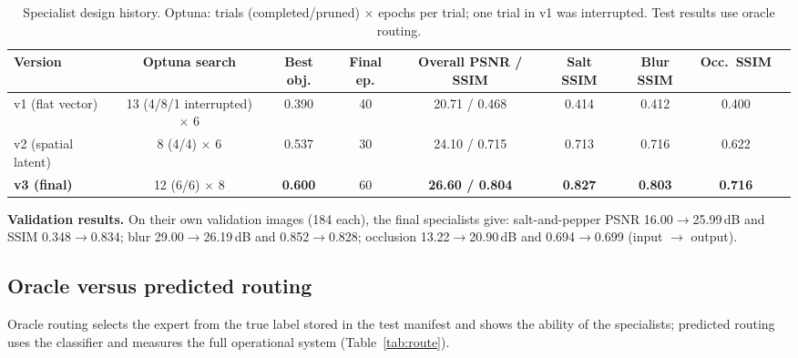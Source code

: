 \documentclass[conference]{IEEEtran}
\begin{document}
\begin{table}[t]
\centering
\caption{Specialist design history. Optuna: trials (completed/pruned) $\times$ epochs per trial; one trial in v1 was interrupted. Test results use oracle routing.}\label{tab:spechist}
\footnotesize\setlength{\tabcolsep}{4pt}
\begin{tabular}{@{}lcccccccc@{}}
\toprule
Version & Optuna search & Best obj. & Final ep. & Overall PSNR / SSIM & Salt SSIM & Blur SSIM & Occ.\ SSIM\\
\midrule
v1 (flat vector) & 13 (4/8/1 interrupted) $\times$ 6 & 0.390 & 40 & 20.71 / 0.468 & 0.414 & 0.412 & 0.400\\
v2 (spatial latent) & 8 (4/4) $\times$ 6 & 0.537 & 30 & 24.10 / 0.715 & 0.713 & 0.716 & 0.622\\
\textbf{v3 (final)} & 12 (6/6) $\times$ 8 & \textbf{0.600} & 60 & \textbf{26.60 / 0.804} & \textbf{0.827} & \textbf{0.803} & \textbf{0.716}\\
\bottomrule
\end{tabular}
\end{table}

\textbf{Validation results.} On their own validation images (184 each), the final specialists give: salt-and-pepper PSNR 16.00$\to$25.99\,dB and SSIM 0.348$\to$0.834; blur 29.00$\to$26.19\,dB and 0.852$\to$0.828; occlusion 13.22$\to$20.90\,dB and 0.694$\to$0.699 (input $\to$ output).

\subsection{Oracle versus predicted routing}
Oracle routing selects the expert from the true label stored in the test manifest and shows the ability of the specialists; predicted routing uses the classifier and measures the full operational system (Table~\ref{tab:route}).
\end{document}
